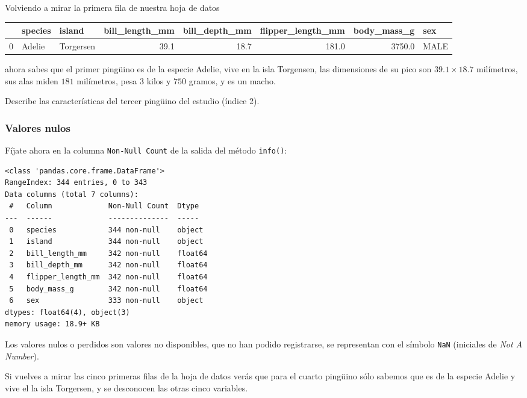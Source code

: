 \documentclass[
  a4paper,
  noprof,
  12pt,
  notoc,
  nosols,
  nobib]{mnye}
\renewenvironment{exercise}[1][]{
            \if\relax\detokenize{#1}\relax
                \ex
            \else
                \ex[note={#1}]
            \fi
        }{\endex}
\theoremstyle{definition}
\newtheorem{exercise}{Ejercicio}[section]
\theoremstyle{remark}
\begin{document}
Volviendo a mirar la primera fila de nuestra hoja de datos

\begin{tabular}{lllrrrrl}
\toprule
{} & species &     island &  bill\_length\_mm &  bill\_depth\_mm &  flipper\_length\_mm &  body\_mass\_g &   sex \\
\midrule
0 &  Adelie &  Torgersen &            39.1 &           18.7 &              181.0 &       3750.0 &  MALE \\
\bottomrule
\end{tabular}

ahora sabes que el primer pingüino es de la especie Adelie, vive en la
isla Torgensen, las dimensiones de su pico son \(39.1 \times 18.7\)
milímetros, sus alas miden \(181\) milímetros, pesa \(3\) kilos y
\(750\) gramos, y es un macho.

\begin{exercise}[]%
\protect\hypertarget{exr-data}{}\label{exr-data}%
Describe las características del tercer pingüino del estudio (índice 2).

\end{exercise}

\hypertarget{valores-nulos}{%
\subsubsection{Valores nulos}\label{valores-nulos}}

Fíjate ahora en la columna \texttt{Non-Null\ Count} de la salida del
método \texttt{info()}:

\begin{verbatim}
<class 'pandas.core.frame.DataFrame'>
RangeIndex: 344 entries, 0 to 343
Data columns (total 7 columns):
 #   Column             Non-Null Count  Dtype  
---  ------             --------------  -----  
 0   species            344 non-null    object 
 1   island             344 non-null    object 
 2   bill_length_mm     342 non-null    float64
 3   bill_depth_mm      342 non-null    float64
 4   flipper_length_mm  342 non-null    float64
 5   body_mass_g        342 non-null    float64
 6   sex                333 non-null    object 
dtypes: float64(4), object(3)
memory usage: 18.9+ KB
\end{verbatim}

Los valores nulos o perdidos son valores no disponibles, que no han
podido registrarse, se representan con el símbolo \texttt{NaN}
(iniciales de \emph{Not A Number}).

Si vuelves a mirar las cinco primeras filas de la hoja de datos verás
que para el cuarto pingüino sólo sabemos que es de la especie Adelie y
vive el la isla Torgersen, y se desconocen las otras cinco variables.
\end{document}
